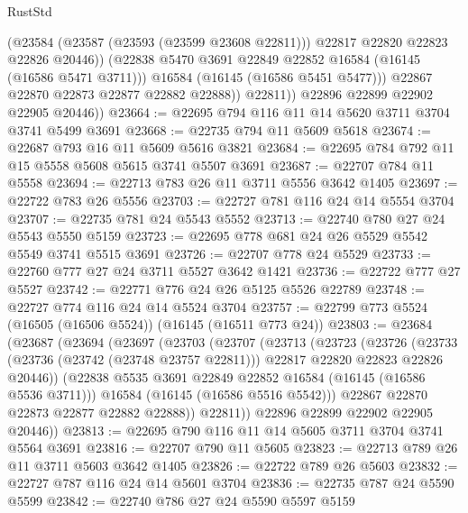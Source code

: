 \begin{lexlean}{RustStd}
\begin{coremodule}
                    (@23584
                      (@23587 (@23593 (@23599 @23608 @22811)))
                      @22817
                      @22820
                      @22823
                      @22826
                      @20446))
                  (@22838 @5470 @3691 @22849 @22852 @16584 (@16145 (@16586 @5471 @3711)))
                  @16584
                  (@16145 (@16586 @5451 @5477)))
                @22867
                @22870
                @22873
                @22877
                @22882
                @22888))
            @22811))
        @22896
        @22899
        @22902
        @22905
        @20446))
@23664 := @22695 @794 @116 @11 @14 @5620 @3711 @3704 @3741 @5499 @3691
@23668 := @22735 @794 @11 @5609 @5618
@23674 := @22687 @793 @16 @11 @5609 @5616 @3821
@23684 := @22695 @784 @792 @11 @15 @5558 @5608 @5615 @3741 @5507 @3691
@23687 := @22707 @784 @11 @5558
@23694 := @22713 @783 @26 @11 @3711 @5556 @3642 @1405
@23697 := @22722 @783 @26 @5556
@23703 := @22727 @781 @116 @24 @14 @5554 @3704
@23707 := @22735 @781 @24 @5543 @5552
@23713 := @22740 @780 @27 @24 @5543 @5550 @5159
@23723 := @22695 @778 @681 @24 @26 @5529 @5542 @5549 @3741 @5515 @3691
@23726 := @22707 @778 @24 @5529
@23733 := @22760 @777 @27 @24 @3711 @5527 @3642 @1421
@23736 := @22722 @777 @27 @5527
@23742 := @22771 @776 @24 @26 @5125 @5526 @22789
@23748 := @22727 @774 @116 @24 @14 @5524 @3704
@23757 := @22799 @773 @5524 (@16505 (@16506 @5524)) (@16145 (@16511 @773 @24))
@23803 := @23684
    (@23687
      (@23694
        (@23697
          (@23703
            (@23707
              (@23713
                (@23723
                  (@23726
                    (@23733
                      (@23736 (@23742 (@23748 @23757 @22811)))
                      @22817
                      @22820
                      @22823
                      @22826
                      @20446))
                  (@22838 @5535 @3691 @22849 @22852 @16584 (@16145 (@16586 @5536 @3711)))
                  @16584
                  (@16145 (@16586 @5516 @5542)))
                @22867
                @22870
                @22873
                @22877
                @22882
                @22888))
            @22811))
        @22896
        @22899
        @22902
        @22905
        @20446))
@23813 := @22695 @790 @116 @11 @14 @5605 @3711 @3704 @3741 @5564 @3691
@23816 := @22707 @790 @11 @5605
@23823 := @22713 @789 @26 @11 @3711 @5603 @3642 @1405
@23826 := @22722 @789 @26 @5603
@23832 := @22727 @787 @116 @24 @14 @5601 @3704
@23836 := @22735 @787 @24 @5590 @5599
@23842 := @22740 @786 @27 @24 @5590 @5597 @5159

\end{coremodule}
\end{lexlean}
